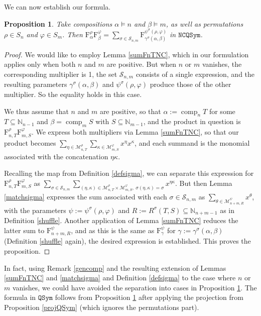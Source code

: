 \documentclass{article}
\newtheorem{prop}[thm]{Proposition}
\theoremstyle{definition}
\begin{document}
\medskip

We can now establish our formula.
\begin{prop}
Take compositions $\alpha \vDash n$ and $\beta \vDash m$, as well as permutations $\rho \in S_{n}$ and $\varphi \in S_{m}$. Then $\mathrm{F}_{\alpha}^{\rho}\mathrm{F}_{\beta}^{\varphi}=\sum_{\sigma\in\mathcal{S}_{n,m}}\mathrm{F}_{\gamma^{\sigma}(\alpha,\beta)}^{\psi^{\sigma}(\rho,\varphi)}$ in $\mathtt{NCQSym}$. \label{prodF}
\end{prop}

\begin{proof}
We would like to employ Lemma \ref{sumFnTNC}, which in our formulation applies only when both $n$ and $m$ are positive. But when $n$ or $m$ vanishes, the corresponding multiplier is 1, the set $\mathcal{S}_{n,m}$ consists of a single expression, and the resulting parameters $\gamma^{\sigma}(\alpha,\beta)$ and $\psi^{\sigma}(\rho,\varphi)$ produce those of the other multiplier. So the equality holds in this case.

We thus assume that $n$ and $m$ are positive, so that $\alpha:=\operatorname{comp}_{n}T$ for some $T\subseteq\mathbb{N}_{n-1}$ and $\beta=\operatorname{comp}_{m}S$ with $S\subseteq\mathbb{N}_{m-1}$, and the product in question is $\mathrm{F}_{n,T}^{\rho}\mathrm{F}_{m,S}^{\varphi}$. We express both multipliers via Lemma \ref{sumFnTNC}, so that our product becomes $\sum_{\eta\in\mathcal{M}_{n,T}^{\rho}}\sum_{\kappa\in\mathcal{M}_{m,S}^{\varphi}}x^{\eta}x^{\kappa}$, and each summand is the monomial associated with the concatenation $\eta\kappa$.

Recalling the map from Definition \ref{defsigma}, we can separate this expression for $\mathrm{F}_{n,T}^{\rho}\mathrm{F}_{m,S}^{\varphi}$ as $\sum_{\sigma\in\mathcal{S}_{n,m}}\sum_{(\eta,\kappa)\in\mathcal{M}_{n,T}^{\rho}\times\mathcal{M}_{m,S}^{\varphi},\ \sigma(\eta,\kappa)=\sigma}x^{\eta\kappa}$. But then Lemma \ref{matchsigma} expresses the sum associated with each $\sigma\in\mathcal{S}_{n,m}$ as $\sum_{\theta\in\mathcal{M}_{n+m,R}^{\psi}}x^{\theta}$, with the parameters $\psi:=\psi^{\sigma}(\rho,\varphi)$ and $R:=R^{\sigma}(T,S)\subseteq\mathbb{N}_{n+m-1}$ as in Definition \ref{shuffle}. Another application of Lemma \ref{sumFnTNC} reduces the latter sum to $\mathrm{F}_{n+m,R}^{\psi}$, and as this is the same as $\mathrm{F}_{\gamma}^{\psi}$ for $\gamma:=\gamma^{\sigma}(\alpha,\beta)$ (Definition \ref{shuffle} again), the desired expression is established. This proves the proposition.
\end{proof}
In fact, using Remark \ref{gencomp} and the resulting extension of Lemmas \ref{sumFnTNC} and \ref{matchsigma} and Definition \ref{defsigma} to the case where $n$ or $m$ vanishes, we could have avoided the separation into cases in Proposition \ref{prodF}. The formula in $\mathtt{QSym}$ follows from Proposition \ref{prodF} after applying the projection from Proposition \ref{projQSym} (which ignores the permutations part).
\end{document}
